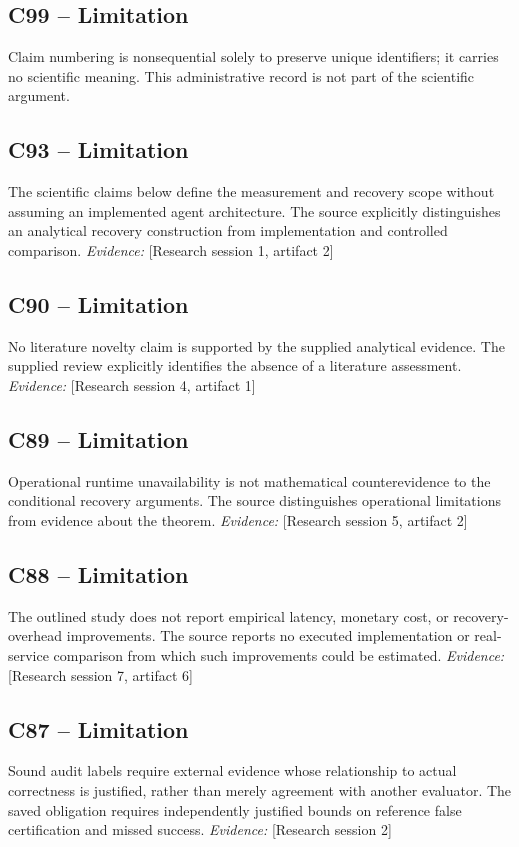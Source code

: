 \documentclass[11pt]{article}
\begin{document}
\begin{sloppypar}
\subsection{C99 -- Limitation}
Claim numbering is nonsequential solely to preserve unique identifiers; it carries no scientific meaning.
This administrative record is not part of the scientific argument.
\subsection{C93 -- Limitation}
The scientific claims below define the measurement and recovery scope without assuming an implemented agent architecture.
The source explicitly distinguishes an analytical recovery construction from implementation and controlled comparison.
\textit{Evidence: }[Research session 1, artifact 2]
\subsection{C90 -- Limitation}
No literature novelty claim is supported by the supplied analytical evidence.
The supplied review explicitly identifies the absence of a literature assessment.
\textit{Evidence: }[Research session 4, artifact 1]
\subsection{C89 -- Limitation}
Operational runtime unavailability is not mathematical counterevidence to the conditional recovery arguments.
The source distinguishes operational limitations from evidence about the theorem.
\textit{Evidence: }[Research session 5, artifact 2]
\subsection{C88 -- Limitation}
The outlined study does not report empirical latency, monetary cost, or recovery-overhead improvements.
The source reports no executed implementation or real-service comparison from which such improvements could be estimated.
\textit{Evidence: }[Research session 7, artifact 6]
\subsection{C87 -- Limitation}
Sound audit labels require external evidence whose relationship to actual correctness is justified, rather than merely agreement with another evaluator.
The saved obligation requires independently justified bounds on reference false certification and missed success.
\textit{Evidence: }[Research session 2]

\end{sloppypar}
\end{document}
